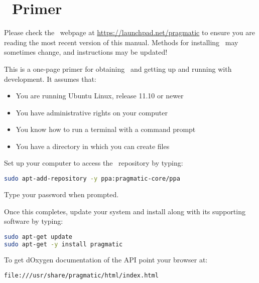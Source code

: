 \chapter*{\pragmatic\ Primer}

Please check the \pragmatic\ webpage at
\href{https://launchpad.net/pragmatic}{https://launchpad.net/pragmatic}
to ensure you are reading the most recent version of this
manual. Methods for installing \pragmatic\ may sometimes change, and
instructions may be updated!

This is a one-page primer for obtaining \pragmatic\ and getting up and
running with development. It assumes that:

\begin{itemize}
\item You are running Ubuntu Linux, release 11.10 or newer
\item You have administrative rights on your computer
\item You know how to run a terminal with a command prompt
\item You have a directory in which you can create files
\end{itemize}

Set up your computer to access the \pragmatic\ repository by typing:

\begin{lstlisting}[language=Bash]
sudo apt-add-repository -y ppa:pragmatic-core/ppa
\end{lstlisting}

Type your password when prompted.

Once this completes, update your system and install \pragmatic along with its
supporting software by typing:

\begin{lstlisting}[language=Bash]
sudo apt-get update
sudo apt-get -y install pragmatic
\end{lstlisting}

To get dOxygen documentation of the API point your browser at:
\begin{lstlisting}[language=Html]
file:///usr/share/pragmatic/html/index.html
\end{lstlisting}
